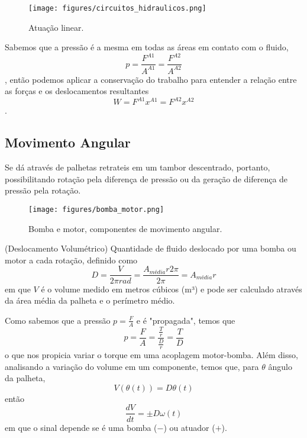 \begin{figure}[H]
    \centering
    \texttt{[image: figures/circuitos\_hidraulicos.png]}
    \caption{Atuação linear.}
    \label{fig:figures-circuito_hidraulico-png}
\end{figure}

Sabemos que a pressão é a mesma em todas as áreas em contato com o fluido, \[
p = \frac{F^{A1}}{A^{A1}} = \frac{F^{A2}}{A^{A2}}
\], então podemos aplicar a conservação do trabalho para entender a relação entre as forças e os deslocamentos resultantes \[
W = F^{A1}x^{A1} = F^{A2}x^{A2}
\].

\subsection*{Movimento Angular}

Se dá através de palhetas retrateis em um tambor descentrado, portanto, possibilitando rotação pela diferença de pressão ou da geração de diferença de pressão pela rotação.

\begin{figure}[H]
    \centering
    \texttt{[image: figures/bomba\_motor.png]}
    \caption{Bomba e motor, componentes de movimento angular.}
    \label{fig:figures-bomba_motor-png}
\end{figure}

\begin{definition}
    (Deslocamento Volumétrico) Quantidade de fluido deslocado por uma bomba ou motor a cada rotação, definido como \[
	D = \frac{V}{2\pi rad} = \frac{A_{média}r2\pi}{2 \pi} = A_{média}r
    \] em que $V$ é o volume medido em metros cúbicos (m³) e pode ser calculado através da área média da palheta e o perímetro médio.
\end{definition}

Como sabemos que a pressão $p = \frac{F}{A}$ e é "propagada", temos que \[
p = \frac{F}{A} = \frac{\frac{T}{r}}{\frac{D}{r}} = \frac{T}{D}
\] o que nos propicia variar o torque em uma acoplagem motor-bomba. Além disso, analisando a variação do volume em um componente, temos que, para $\theta$ ângulo da palheta, \[
V(\theta(t)) = D\theta(t)
\] então \[
\frac{dV}{dt} = \pm D\omega(t)
\] em que o sinal depende se é uma bomba ($-$) ou atuador ($+$).

